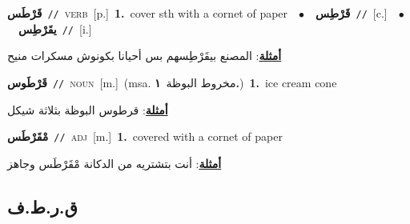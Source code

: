 \documentclass[10pt,a4paper,twoside]{article} %
\begin{document}
\begin{multicols}{2}
{\setlength\topsep{0pt}\textbf{\foreignlanguage{arabic}{قَرْطَس}}\ {\color{gray}\texttt{//}\color{black}}\ \textsc{verb}\ [p.]\ \textbf{1.}~cover sth with a cornet of paper\ \ $\bullet$\ \ \setlength\topsep{0pt}\textbf{\foreignlanguage{arabic}{قَرْطِس}}\ {\color{gray}\texttt{//}\color{black}}\ [c.]\ \ $\bullet$\ \ \setlength\topsep{0pt}\textbf{\foreignlanguage{arabic}{يقَرْطِس}}\ {\color{gray}\texttt{//}\color{black}}\ [i.]\  \begin{flushright}\color{gray}\foreignlanguage{arabic}{\textbf{\underline{\foreignlanguage{arabic}{أمثلة}}}: المصنع بيقَرْطِسهم بس أحيانا بكونوش مسكرات منيح}\end{flushright}\color{black}} \vspace{2mm}

{\setlength\topsep{0pt}\textbf{\foreignlanguage{arabic}{قَرْطَوس}}\ {\color{gray}\texttt{//}\color{black}}\ \textsc{noun}\ [m.]\ \color{gray}(msa. \foreignlanguage{arabic}{مخروط البوظة}~\foreignlanguage{arabic}{\textbf{١.}})\color{black}\ \textbf{1.}~ice cream cone\  \begin{flushright}\color{gray}\foreignlanguage{arabic}{\textbf{\underline{\foreignlanguage{arabic}{أمثلة}}}: قرطوس البوظة بثلاثة شيكل}\end{flushright}\color{black}} \vspace{2mm}

{\setlength\topsep{0pt}\textbf{\foreignlanguage{arabic}{مْقَرْطَس}}\ {\color{gray}\texttt{//}\color{black}}\ \textsc{adj}\ [m.]\ \textbf{1.}~covered with a cornet of paper\  \begin{flushright}\color{gray}\foreignlanguage{arabic}{\textbf{\underline{\foreignlanguage{arabic}{أمثلة}}}: أنت بتشتريه من الدكانة مْقَرْطَس وجاهز}\end{flushright}\color{black}} \vspace{2mm}

\vspace{-3mm}
\subsection*{\color{blue}\foreignlanguage{arabic}{ق.ر.ط.ف}\color{blue}{}} 


\end{multicols}
\end{document}
